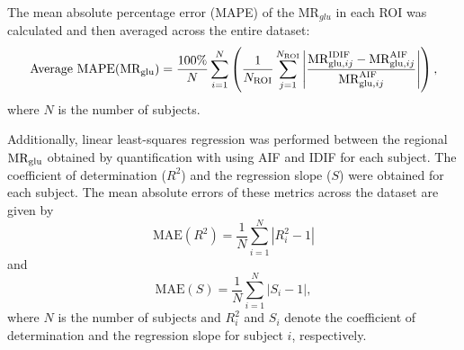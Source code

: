 The mean absolute percentage error (MAPE) of the \(\textrm{MR}_{glu}\) in each ROI was calculated and then averaged across the entire dataset:
\begin{equation}
	\text{Average MAPE}(\text{MR}_{\text{glu}})= \frac{100\%}{N} \sum_{i=1}^{N} \left( \frac{1}{N_{\text{ROI}}} \sum_{j=1}^{N_{\text{ROI}}} \left| \frac{\textrm{MR}_{\textrm{glu},ij}^{\textrm{IDIF}} - \textrm{MR}_{\textrm{glu},ij}^{\textrm{AIF}}}{\textrm{MR}_{\textrm{glu},ij}^{\textrm{AIF}}} \right| \right),
\end{equation}
where $N$ is the number of subjects.

Additionally, linear least-squares regression was performed between the regional \(\text{MR}_{\text{glu}}\) obtained by quantification with using AIF and IDIF for each subject. The coefficient of determination (\(R^2\)) and the regression slope (\(S\)) were obtained for each subject. The mean absolute errors of these metrics across the dataset are given by
\begin{equation}
	\text{MAE}(R^2) = \frac{1}{N} \sum_{i=1}^{N} \left| R^2_i - 1 \right|
\end{equation}
and
\begin{equation}
	\text{MAE}(S) = \frac{1}{N} \sum_{i=1}^{N} \left| S_i - 1 \right|,
\end{equation}
where $N$ is the number of subjects and \(R^2_i\) and \(S_i\) denote the coefficient of determination and the regression slope for subject \(i\), respectively.
